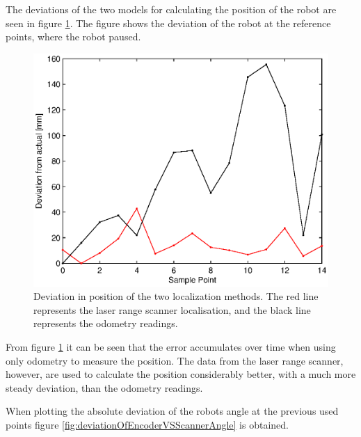 The deviations of the two models for calculating the position of the robot are seen in figure \ref{fig:deviationOfEncoderVSScanner}.
The figure shows the deviation of the robot at the reference points, where the robot paused.

\begin{figure}[H]
\centering
\includegraphics[width = 13cm]{graphics/deviation_encoderVSscanner}
\caption[Deviation in position of the two localization methods.]{Deviation in position of the two localization methods. The red line represents the laser range scanner localisation, and the black line represents the odometry readings.}
\label{fig:deviationOfEncoderVSScanner}
\end{figure}

From figure \ref{fig:deviationOfEncoderVSScanner} it can be seen that the error accumulates over time
when using only odometry to measure the position.
The data from the laser range scanner, however, are used to calculate the position considerably better,
with a much more steady deviation, than the odometry readings.

When plotting the absolute deviation of the robots angle at the previous used points figure \ref{fig:deviationOfEncoderVSScannerAngle} is obtained.


